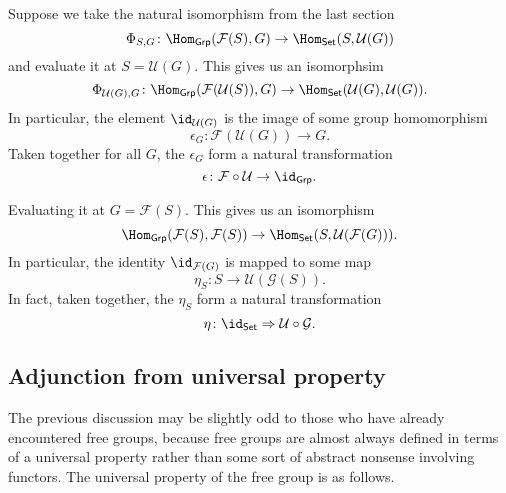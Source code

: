 \documentclass[notes.tex]{subfiles}
\begin{document}
Suppose we take the natural isomorphism from the last section
\begin{equation*}
  \Phi_{S, G}\colon \Hom_{\mathsf{Grp}}(\mathcal{F}(S), G) \to \Hom_{\mathsf{Set}}(S, \mathcal{U}(G))
\end{equation*}
and evaluate it at $S = \mathcal{U}(G)$. This gives us an isomorphsim
\begin{equation*}
  \Phi_{\mathcal{U}(G), G}\colon \Hom_{\mathsf{Grp}}(\mathcal{F}(\mathcal{U}(S)), G) \to \Hom_{\mathsf{Set}}(\mathcal{U}(G), \mathcal{U}(G)).
\end{equation*}
In particular, the element $\id_{\mathcal{U}(G)}$ is the image of some group homomorphism
\begin{equation*}
  \epsilon_{G}\colon \mathcal{F}(\mathcal{U}(G)) \to G.
\end{equation*}
Taken together for all $G$, the $\epsilon_{G}$ form a natural transformation
\begin{equation*}
  \epsilon\colon \mathcal{F} \circ \mathcal{U} \to \id_{\mathsf{Grp}}.
\end{equation*}

Evaluating it at $G = \mathcal{F}(S)$. This gives us an isomorphism
\begin{equation*}
  \Hom_{\mathsf{Grp}}(\mathcal{F}(S), \mathcal{F}(S)) \to \Hom_{\mathsf{Set}}(S, \mathcal{U}(\mathcal{F}(G))).
\end{equation*}
In particular, the identity $\id_{\mathcal{F}(G)}$ is mapped to some map
\begin{equation*}
  \eta_{S}\colon S \to \mathcal{U}(\mathcal{G}(S)).
\end{equation*}
In fact, taken together, the $\eta_{S}$ form a natural transformation
\begin{equation*}
  \eta\colon \id_{\mathsf{Set}} \Rightarrow \mathcal{U} \circ \mathcal{G}.
\end{equation*}

\subsection{Adjunction from universal property}
\label{ssc:adjunction_from_universal_property}

The previous discussion may be slightly odd to those who have already encountered free groups, because free groups are almost always defined in terms of a universal property rather than some sort of abstract nonsense involving functors. The universal property of the free group is as follows.
\end{document}
